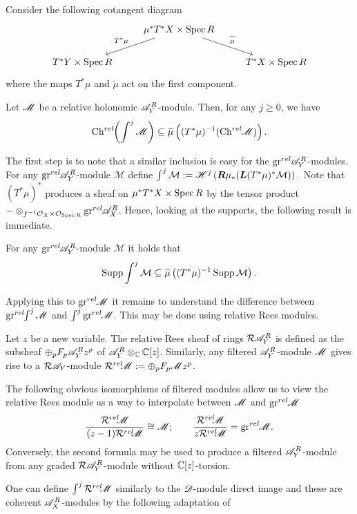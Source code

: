 Consider the following cotangent diagram
$$
\begin{tikzcd}
    & \mu^* T^* X\times \Spec R \arrow[swap]{ld}{T^* \mu} \arrow{rd}{\widetilde{\mu}} & \\
    T^* Y\times \Spec R & & T^*X\times \Spec R
\end{tikzcd}
$$
where the maps $T^*\mu$ and $\widetilde{\mu}$ act on the first component.
\begin{theorem}
    Let $\mathscr{M}$ be a relative holonomic $\mathscr{A}_Y^R$-module. Then, for any $j\geq 0$, we have 
    $$\operatorname{Ch}^{rel}\mkern-5mu\left(\int^j \mathscr{M} \right)\subseteq  \widetilde{\mu}\left((T^*\mu)^{-1}(\operatorname{Ch}^{rel}\mkern-5mu \mathscr{M}) \right).$$
\end{theorem}
The first step is to note that a similar inclusion is easy for the $\operatorname{gr}^{rel}\mkern-5mu \mathscr{A}_Y^R$-modules. For any $\operatorname{gr}^{rel}\mkern-5mu \mathscr{A}_Y^R$-module $\mathcal{M}$ define $\int^j \mathcal{M} :=  \mathscr{H}^j\left(\boldsymbol{R} \mu_* (\boldsymbol{L}(T^*\mu)^* \mathcal{M})\right).$ Note that $(T^*\mu)^*$ produces a sheaf on $\mu^* T^* X \times \operatorname{Spec} R$ by the tensor product  ${-}\otimes_{f^{-1}\mathcal{O}_X\times \mathcal{O}_{\operatorname{Spec} R}} \operatorname{gr}^{rel}\mkern-5mu \mathscr{A}_X^R$. Hence, looking at the supports, the following result is immediate.
\begin{lemma}
    For any $\operatorname{gr}^{rel}\mkern-5mu\mathscr{A}_Y^R$-module $\mathcal{M}$ it holds that
    $$\operatorname{Supp} \int^j \mathcal{M}\subseteq \widetilde{\mu}\left((T^* \mu)^{-1} \operatorname{Supp} \mathcal{M}\right).$$
\end{lemma}
Applying this to $\operatorname{gr}^{rel}\mkern-5mu \mathscr{M}$ it remains to understand the difference between $\operatorname{gr}^{rel}\mkern-5mu\int^j \mathscr{M}$ and $\int^j \operatorname{gr}^{rel}\mkern-5mu \mathscr{M}$. This may be done using relative Rees modules.
\begin{definition}
    Let $z$ be a new variable. The relative Rees sheaf of rings $\mathcal{R}\mathscr{A}_Y^R$ is defined as the subsheaf $\oplus_p F_p \mathscr{A}_Y^R z^p $ of $\mathscr{A}_Y^R \otimes_{\mathbb{C}} \mathbb{C}[z]$. Similarly, any filtered $\mathscr{A}_Y^R$-module $\mathscr{M}$ gives rise to a $\mathcal{R}\mathscr{A}_Y$-module $\mathcal{R}^{rel}\mkern-5mu\mathscr{M} := \oplus_p F_p \mathscr{M} z^p$.
\end{definition}
The following obvious isomorphisms of filtered modules allow us to view the relative Rees module as a way to interpolate between $\mathscr{M}$ and $\operatorname{gr}^{rel}\mkern-5mu\mathscr{M}$
$$\frac{\mathcal{R}^{rel}\mkern-5mu\mathscr{M}}{(z-1)\mathcal{R}^{rel}\mkern-5mu\mathscr{M}} \cong \mathscr{M}; \qquad \frac{\mathcal{R}^{rel}\mkern-5mu\mathscr{M}}{z\mathcal{R}^{rel}\mkern-5mu\mathscr{M}} = \operatorname{gr}^{rel}\mkern-5mu \mathscr{M}.$$
Conversely, the second formula may be used to produce a filtered $\mathscr{A}_Y^R$-module from any graded $\mathcal{R}\mathscr{A}_Y^R$-module without $\mathbb{C}[z]$-torsion.

One can define $\int^j \mathcal{R}^{rel}\mkern-5mu \mathscr{M}$ similarly to the $\mathscr{D}$-module direct image and these are coherent $\mathscr{A}_X^R$-modules by the following adaptation of 

